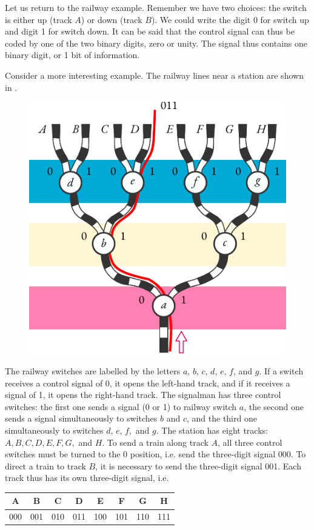 Let us return to the railway example. Remember we have two choices:
the switch is either up (track $A$) or down (track $B$). We could write the
digit 0 for switch up and digit 1 for switch down. It can be said that the
control signal can thus be coded by one of the two binary digits, zero or
unity. The signal thus contains one binary digit, or 1 bit of information.

Consider a more interesting example. The railway lines near a station
are shown in . 

\begin{figure}[!ht]
 \centering
 \includegraphics[width=0.8\linewidth]{figures/railway-switches.pdf}
 \end{figure}

The railway switches are labelled by the letters $a, \,
b, \, c, \, d, \, e, \, f$, and $g$. If a switch receives a control signal of 0, it opens the left-hand track, and if it receives a signal of 1, it opens the right-hand
track. The signalman has three control switches: the first one sends
a signal (0 or 1) to railway switch $a$, the second one sends a signal
simultaneously to switches $b$ and $c$, and the third one simultaneously to
switches $d, \, e, \, f,$ and $g$. The station has eight tracks: $A, B, C, D, E, F, G,$ and $H$. To send a train along track $A$, all three control switches must be turned to the 0 position, i.e. send the three-digit signal 000. To direct
a train to track $B$, it is necessary to send the three-digit signal 001. Each
track thus has its own three-digit signal, i.e.
\begin{center}
\setlength\arrayrulewidth{0.75pt}
\begin{tabular}{cccccccc}
\toprule
A & B & C & D & E & F & G & H\\
\midrule
000 & 001 & 010 & 011 & 100 & 101 & 110 & 111 \\
\bottomrule
\end{tabular}
\end{center}

